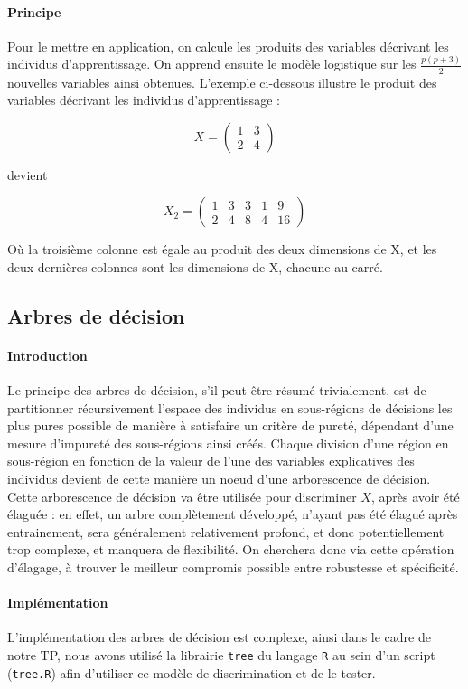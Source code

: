\documentclass{report}
\begin{document}
\paragraph{Principe}
Pour le mettre en application, on calcule les produits des variables décrivant les individus d'apprentissage. On apprend ensuite le modèle logistique sur les $\frac{p(p + 3)}{2}$ nouvelles variables ainsi obtenues. L'exemple ci-dessous illustre le produit des variables décrivant les individus d'apprentissage :

$$ X = \begin{pmatrix} 1 & 3 \\ 2 & 4 \end{pmatrix}$$


devient


$$ X_2 = \begin{pmatrix} 1 & 3 & 3 & 1 & 9 \\
2 & 4 & 8 & 4 & 16 \end{pmatrix}$$

Où la troisième colonne est égale au produit des deux dimensions de X, et les deux dernières colonnes sont les dimensions de X, chacune au carré.



\subsection{Arbres de décision}
\paragraph{Introduction}
Le principe des arbres de décision, s'il peut être résumé trivialement, est de partitionner récursivement l'espace des individus en sous-régions de décisions les plus pures possible de manière à satisfaire un critère de pureté, dépendant d'une mesure d'impureté des sous-régions ainsi créés. Chaque division d'une région en sous-région en fonction de la valeur de l'une des variables explicatives des individus devient de cette manière un noeud d'une arborescence de décision. Cette arborescence de décision va être utilisée pour discriminer $X$, après avoir été élaguée : en effet, un arbre complètement développé, n'ayant pas été élagué après entrainement, sera généralement relativement profond, et donc potentiellement trop complexe, et manquera de flexibilité. On cherchera donc via cette opération d'élagage, à trouver le meilleur compromis possible entre robustesse et spécificité.

\paragraph{Implémentation}
L'implémentation des arbres de décision est complexe, ainsi dans le cadre de notre TP, nous avons utilisé la librairie \verb+tree+ du langage \verb+R+ au sein d'un script (\verb+tree.R+) afin d'utiliser ce modèle de discrimination et de le tester.
\end{document}
